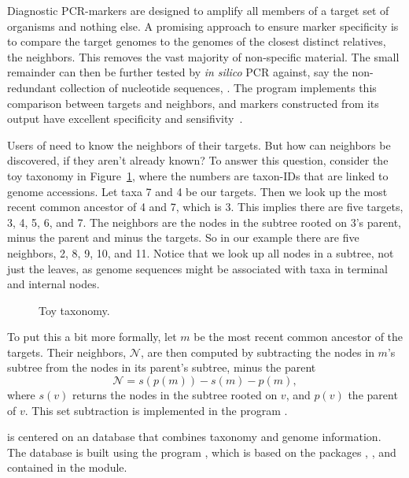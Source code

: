 Diagnostic PCR-markers are designed to amplify all members of a target
set of organisms and nothing else. A promising approach to ensure
marker specificity is to compare the target genomes to the genomes of
the closest distinct relatives, the neighbors. This removes the vast
majority of non-specific material. The small remainder can then be
further tested by \emph{in silico} PCR against, say the non-redundant
collection of nucleotide sequences, . The program 
implements this comparison between targets and neighbors, and markers
constructed from its output have excellent specificity and
sensifivity~\cite{hau21:fur}.

Users of  need to know the neighbors of their targets. But how
can neighbors be discovered, if they aren't already known? To answer
this question, consider the toy taxonomy in Figure~\ref{fig:tax},
where the numbers are taxon-IDs that are linked to genome
accessions. Let taxa 7 and 4 be our targets. Then we look up the most
recent common ancestor of 4 and 7, which is 3. This implies there are
five targets, 3, 4, 5, 6, and 7. The neighbors are the nodes in the
subtree rooted on 3's parent, minus the parent and minus the
targets. So in our example there are five neighbors, 2, 8, 9, 10, and
11. Notice that we look up all nodes in a subtree, not just the
leaves, as genome sequences might be associated with taxa in terminal
and internal nodes.

\begin{figure}
\begin{center}

\end{center}
\caption{Toy taxonomy.}\label{fig:tax}
\end{figure}

To put this a bit more formally, let $m$ be the most recent common
ancestor of the targets. Their neighbors, $\mathcal{N}$, are then
computed by subtracting the nodes in $m$'s subtree from the nodes in
its parent's subtree, minus the parent
\begin{equation}\label{eq:nei}
\mathcal{N} = s(p(m)) - s(m) - p(m),
\end{equation}
where $s(v)$ returns the nodes in the subtree rooted on $v$, and
$p(v)$ the parent of $v$. This set subtraction is implemented in the
program .

 is centered on an 
database that combines taxonomy and genome information. The database
is built using the program , which is based on the
packages , , and  contained in the
 module.

